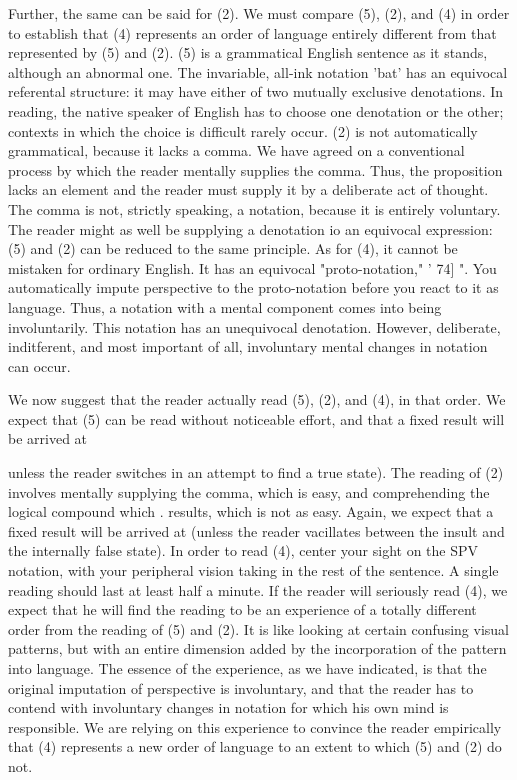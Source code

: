 \documentclass[10pt,twoside]{memoir}
\begin{document}
\begin{enumerate}
{\begin{enumerate}
\begin{sysrules}
\begin{sysrules}
\begin{sysrules}
\begin{sysrules}
{\begin{enumerate}
{{{{{{{{{{Further, the same can be said for (2). We must compare (5), (2), and (4) in 
order to establish that (4) represents an order of language entirely different 
from that represented by (5) and (2). (5) is a grammatical English sentence 
as it stands, although an abnormal one. The invariable, all-ink notation 'bat' 
has an equivocal referental structure: it may have either of two mutually 
exclusive denotations. In reading, the native speaker of English has to choose 
one denotation or the other; contexts in which the choice is difficult rarely 
occur. (2) is not automatically grammatical, because it lacks a comma. We 
have agreed on a conventional process by which the reader mentally supplies 
the comma. Thus, the proposition lacks an element and the reader must 
supply it by a deliberate act of thought. The comma is not, strictly speaking, 
a notation, because it is entirely voluntary. The reader might as well be 
supplying a denotation io an equivocal expression: (5) and (2) can be 
reduced to the same principle. As for (4), it cannot be mistaken for ordinary 
English. It has an equivocal "proto-notation," ' 74] ". You automatically 
impute perspective to the proto-notation before you react to it as language. 
Thus, a notation with a mental component comes into being involuntarily. 
This notation has an unequivocal denotation. However, deliberate, 
inditferent, and most important of all, involuntary mental changes in 
notation can occur. 

We now suggest that the reader actually read (5), (2), and (4), in that 
order. We expect that (5) can be read without noticeable effort, and that a 
fixed result will be arrived at {unless the reader switches in an attempt to 
find a true state). The reading of (2) involves mentally supplying the comma, 
which is easy, and comprehending the logical compound which . results, 
which is not as easy. Again, we expect that a fixed result will be arrived at 
(unless the reader vacillates between the insult and the internally false state). 
In order to read (4), center your sight on the SPV notation, with your 
peripheral vision taking in the rest of the sentence. A single reading should 
last at least half a minute. If the reader will seriously read (4), we expect that 
he will find the reading to be an experience of a totally different order from 
the reading of (5) and (2). It is like looking at certain confusing visual 
patterns, but with an entire dimension added by the incorporation of the 
pattern into language. The essence of the experience, as we have indicated, is 
that the original imputation of perspective is involuntary, and that the reader 
has to contend with involuntary changes in notation for which his own mind 
is responsible. We are relying on this experience to convince the reader 
empirically that (4) represents a new order of language to an extent to which 
(5) and (2) do not. 

}}}}}}}}}}}
\end{enumerate}}
\end{sysrules}
\end{sysrules}
\end{sysrules}
\end{sysrules}
\end{enumerate}}
\end{enumerate}
\end{document}
